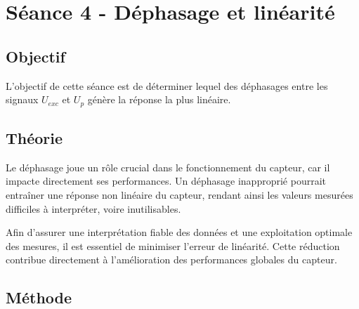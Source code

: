 \section{Séance 4 - Déphasage et linéarité}

\subsection{Objectif}

L'objectif de cette séance est de déterminer lequel des déphasages entre les signaux 
$U_{exc}$ et $U_{p}$ génère la réponse la plus linéaire.

\subsection{Théorie}

Le déphasage joue un rôle crucial dans le fonctionnement du capteur, car il impacte directement 
ses performances. Un déphasage inapproprié pourrait entraîner une réponse non linéaire du capteur,
 rendant ainsi les valeurs mesurées difficiles à interpréter, voire inutilisables. 
 
 Afin d'assurer une interprétation fiable des données et une exploitation optimale des mesures,
  il est essentiel de minimiser l'erreur de linéarité. Cette réduction contribue directement à 
  l'amélioration des performances globales du capteur.


\subsection{Méthode}

